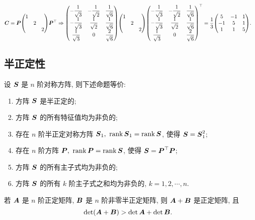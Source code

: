 \begin{solution}
\begin{enumerate}[label=(\arabic{*})]
        $\vb*{C}=\vb*{P}\mqty(1\\&2\\&&2)\vb*{P}^\top\Rightarrow\mqty(-\dfrac{1}{\sqrt{3}}&-\dfrac{1}{\sqrt{2}}&\dfrac{1}{\sqrt{6}}\\[6pt]-\dfrac{1}{\sqrt{3}}&\dfrac{1}{\sqrt{2}}&\dfrac{1}{\sqrt{6}}\\[6pt]\dfrac{1}{\sqrt{3}}&0&\dfrac{2}{\sqrt{6}})\mqty(1\\&2\\&&2)\mqty(-\dfrac{1}{\sqrt{3}}&-\dfrac{1}{\sqrt{2}}&\dfrac{1}{\sqrt{6}}\\[6pt]-\dfrac{1}{\sqrt{3}}&\dfrac{1}{\sqrt{2}}&\dfrac{1}{\sqrt{6}}\\[6pt]\dfrac{1}{\sqrt{3}}&0&\dfrac{2}{\sqrt{6}})^\top=\dfrac{1}{3}\mqty(5&-1&1\\-1&5&1\\1&1&5).$
    \end{enumerate}
\end{solution}

\subsection{半正定性}

\begin{theorem}[对称方阵的等价命题]
    设 $\vb*{S}$ 是 $n$ 阶对称方阵, 则下述命题等价:
    \begin{enumerate}[label=(\arabic{*})]
        \item 方阵 $\vb*{S}$ 是半正定的;
        \item 方阵 $\vb*{S}$ 的所有特征值均为非负的;
        \item 存在 $n$ 阶半正定对称方阵 $\vb*{S}_1,~\rank\vb*{S}_1=\rank\vb*{S}$, 使得 $\vb*{S}=\vb*{S}_1^2$;
        \item 存在 $n$ 阶方阵 $\vb*{P},~\rank\vb*{P}=\rank\vb*{S}$, 使得 $\vb*{S}=\vb*{P}^\top\vb*{P}$;
        \item 方阵 $\vb*{S}$ 的所有主子式均为非负的;
        \item 方阵 $\vb*{S}$ 的所有 $k$ 阶主子式之和均为非负的, $k=1,2,\cdots,n.$
    \end{enumerate}
\end{theorem}

\begin{theorem}
    若 $\vb*{A}$  是 $n$ 阶正定矩阵, $\vb*{B}$ 是 $n$ 阶非零半正定矩阵, 则 $\vb*{A}+\vb*{B}$ 是正定矩阵, 且 $$\det(\vb*{A}+\vb*{B})>\det\vb*{A}+\det\vb*{B}.$$
\end{theorem}

